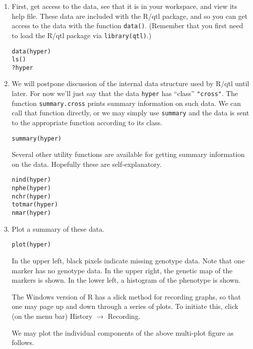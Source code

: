 \documentclass[10pt,letterpaper]{article}
\newcommand{\usercolor}{\color [named]{BlueViolet}}
\newcommand{\othercolor}{\color [named]{Mahogany}}
\begin{document}
\begin{enumerate}

\item First, get access to the data, see that it is in your
workspace, and view its help file.  These data are included with the
R/qtl package, and so you can get access to the data with the function
\verb-data()-.  (Remember that you first need to load the R/qtl
package via \verb-library(qtl)-.)

\usercolor \verb|data(hyper)| \\
\verb|ls()| \\
\verb|?hyper| \normalcolor

\item We will postpone discussion of the internal data structure used
by R/qtl until later.  For now we'll just say that the data
\verb-hyper- has ``class'' \verb-"cross"-.  The function
\verb-summary.cross- prints summary information on such data.  We can
call that function directly, or we may simply use \verb-summary- and
the data is sent to the appropriate function according to its class.

\usercolor \verb|summary(hyper)| 
\normalcolor

Several other utility functions are available for getting summary
information on the data.  Hopefully these are self-explanatory.  

\usercolor
\verb|nind(hyper)| \\
\verb|nphe(hyper)| \\
\verb|nchr(hyper)| \\
\verb|totmar(hyper)| \\
\verb|nmar(hyper)| \normalcolor

\item Plot a summary of these data.

\usercolor \verb|plot(hyper)| \normalcolor

In the upper left, black pixels indicate missing genotype data.  Note
that one marker has no genotype data.  In the upper right, the genetic
map of the markers is shown.  In the lower left, a histogram of the
phenotype is shown.

The Windows version of R has a slick method for recording
graphs, so that one may page up and down through a series of plots.
To initiate this, click (on the menu bar) \othercolor History
\normalcolor $\rightarrow$ \othercolor Recording\normalcolor .

We may plot the individual components of the above multi-plot figure
as follows.


\end{enumerate}
\end{document}

